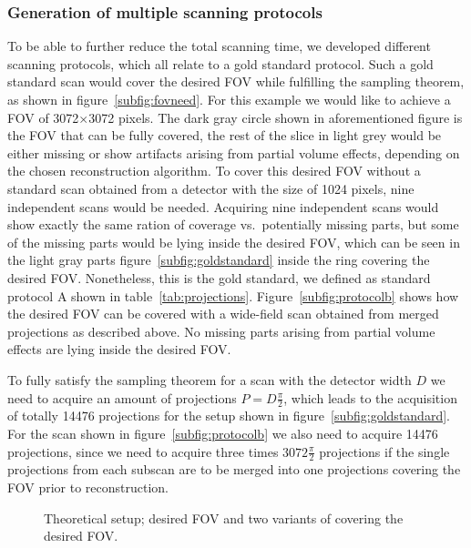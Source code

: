 \subsubsection{Generation of multiple scanning protocols}
To be able to further reduce the total scanning time, we developed different scanning protocols, which all relate to a gold standard protocol. Such a gold standard scan would cover the desired FOV while fulfilling the sampling theorem, as shown in figure~\ref{subfig:fovneed}. For this example we would like to achieve a FOV of 3072$\times$3072 pixels. The dark gray circle shown in aforementioned figure is the FOV that can be fully covered, the rest of the slice in light grey would be either missing or show artifacts arising from partial volume effects, depending on the chosen reconstruction algorithm. To cover this desired FOV without a standard scan obtained from a detector with the size of 1024 pixels, nine independent scans would be needed. Acquiring nine independent scans would show exactly the same ration of coverage vs.\ potentially missing parts, but some of the missing parts would be lying inside the desired FOV, which can be seen in the light gray parts figure~\ref{subfig:goldstandard} inside the ring covering the desired FOV. Nonetheless, this is the gold standard, we defined as standard protocol A shown in table~\ref{tab:projections}. Figure~\ref{subfig:protocolb} shows how the desired FOV can be covered with a wide-field scan obtained from merged projections as described above. No missing parts arising from partial volume effects are lying inside the desired FOV.

To fully satisfy the sampling theorem for a scan with the detector width $D$ we need to acquire an amount of projections $P=D\frac{\pi}{2}$, which leads to the acquisition of totally 14476 projections for the setup shown in figure~\ref{subfig:goldstandard}. For the scan shown in figure~\ref{subfig:protocolb} we also need to acquire 14476 projections, since we need to acquire three times $3072\frac{\pi}{2}$ projections if the single projections from each subscan are to be merged into one projections covering the FOV prior to reconstruction.
\cbend

\cbstart
\begin{figure*}
	\centering
	
	\caption{Theoretical setup; desired FOV and two variants of covering the desired FOV.}
	\label{fig:goldstandard}
\end{figure*}
\cbend

